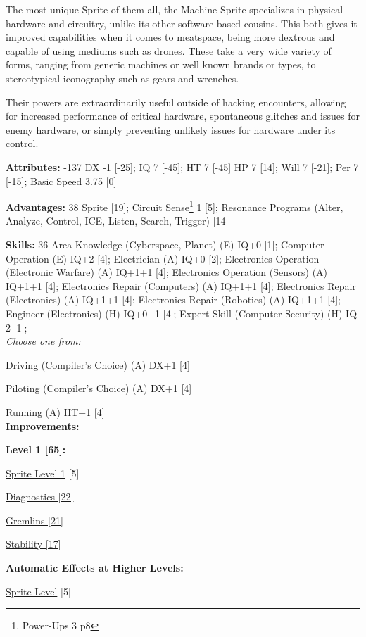 \begin{multicols*}{3}
The most unique Sprite of them all, the Machine Sprite specializes in physical hardware and circuitry, unlike its other software based cousins. This both gives it improved capabilities when it comes to meatspace, being more dextrous and capable of using mediums such as drones. These take a very wide variety of forms, ranging from generic machines or well known brands or types, to stereotypical iconography such as gears and wrenches.

Their powers are extraordinarily useful outside of hacking encounters, allowing for increased performance of critical hardware, spontaneous glitches and issues for enemy hardware, or simply preventing unlikely issues for hardware under its control.

\textbf{Attributes:} -137
DX -1 [-25]; IQ 7 [-45]; HT 7 [-45]
HP 7 [14]; Will 7 [-21]; Per 7 [-15]; Basic Speed 3.75 [0]

\textbf{Advantages:} 38
Sprite [19]; Circuit Sense\footnote{Power-Ups 3 p8} 1 [5]; Resonance Programs (Alter, Analyze, Control, ICE, Listen, Search, Trigger) [14]

\textbf{Skills:} 36
Area Knowledge (Cyberspace, Planet) (E) IQ+0 [1]; Computer Operation (E) IQ+2 [4]; Electrician (A) IQ+0 [2]; Electronics Operation (Electronic Warfare) (A) IQ+1+1 [4]; Electronics Operation (Sensors) (A) IQ+1+1 [4]; Electronics Repair (Computers) (A) IQ+1+1 [4]; Electronics Repair (Electronics) (A) IQ+1+1 [4];  Electronics Repair (Robotics) (A) IQ+1+1 [4];  Engineer (Electronics) (H) IQ+0+1 [4]; Expert Skill (Computer Security) (H) IQ-2 [1]; \\

\textit{Choose one from:}

Driving (Compiler's Choice) (A) DX+1 [4]

Piloting (Compiler's Choice) (A) DX+1 [4]

Running (A) HT+1 [4]\\

\textbf{ Improvements:}

\textbf{Level 1 [65]:}

\hyperref[sprite_level]{Sprite Level 1} [5]

\hyperref[diagnostics]{Diagnostics [22]}

\hyperref[gremlins]{Gremlins [21]}

\hyperref[stability]{Stability [17]}

\textbf{Automatic Effects at Higher Levels:}

\hyperref[sprite_level]{Sprite Level} [5]


\end{multicols*}
